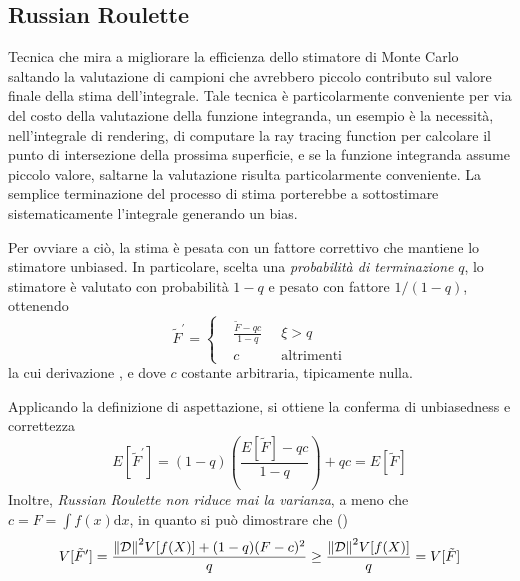 \subsection{Russian Roulette}\label{chapter6:variance:russianRoulette}
Tecnica che mira a migliorare la efficienza dello stimatore di Monte Carlo saltando la valutazione di campioni che avrebbero piccolo contributo 
sul valore finale della stima dell'integrale. Tale tecnica \`e particolarmente conveniente per via del costo della valutazione della funzione 
integranda, un esempio \`e la necessit\`a, nell'integrale di rendering, di computare la ray tracing function per calcolare il punto di intersezione 
della prossima superficie, e se la funzione integranda assume piccolo valore, saltarne la valutazione risulta particolarmente conveniente. La semplice 
terminazione del processo di stima porterebbe a sottostimare sistematicamente l'integrale generando un bias.\par
Per ovviare a ci\`o, la stima \`e pesata con un fattore correttivo che mantiene lo stimatore unbiased. In particolare, scelta una \textit{probabilit\`a
di terminazione} $q$, lo stimatore \`e valutato con probabilit\`a $1-q$ e pesato con fattore $1/(1-q)$, ottenendo
\begin{equation}\label{chapter6:variance:russianEstimator}
	\tilde{F}^\prime=\left\{\begin{aligned}
		&\frac{\tilde{F}-qc}{1-q}\;\;&\xi>q\\
		&c &\text{altrimenti}
	\end{aligned}\right.
\end{equation}
la cui derivazione \cite{pegoraro}, e dove $c$ costante arbitraria, tipicamente nulla.\par
Applicando la definizione di aspettazione, si ottiene la conferma di unbiasedness e correttezza
\begin{equation}
	E[\tilde{F}^\prime]=(1-q)\left(\frac{E[\tilde{F}]-qc}{1-q}\right)+qc=E[\tilde{F}]
\end{equation}
Inoltre, \textit{Russian Roulette non riduce mai la varianza}, a meno che \\ $c=F=\int f(x)\mathrm{d}x$, in quanto si pu\`o dimostrare che 
(\cite{pegoraro})
\begin{equation}
	V[\tilde{F}^\prime]=\frac{\norm{\mathcal{D}}^2V[f(X)]+(1-q)(F-c)^2}{q}\geq\frac{\norm{\mathcal{D}}^2V[f(X)]}{q}=V[\tilde{F}]
\end{equation}
